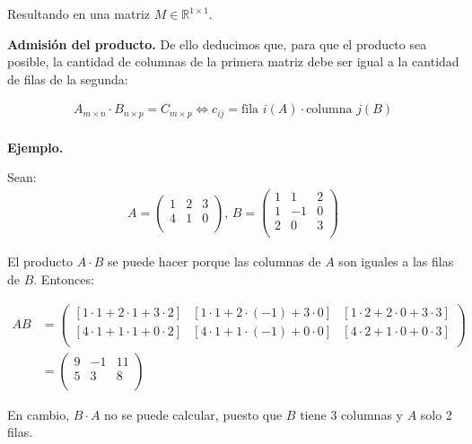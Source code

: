 \documentclass[12pt]{article}
\begin{document}
Resultando en una matriz \(M \in \mathbb{R}^{1 \times 1}\).

\textbf{Admisión del producto.}
De ello deducimos que,
para que el producto sea posible,
la cantidad de columnas de la primera matriz debe ser igual a la cantidad
de filas de la segunda:

\begin{align*}
  A_{m \times n} \cdot B_{n \times p} = C_{m \times p} \iff c_{ij} = \text{fila }i(A) \cdot \text{columna }j(B) \\
\end{align*}

\textbf{Ejemplo.}

Sean:
\begin{align*}
  A = \begin{pmatrix}
        1 & 2 & 3 \\
        4 & 1 & 0 \\
      \end{pmatrix}
  \text{, }
  B = \begin{pmatrix}
        1 & 1  & 2 \\
        1 & -1 & 0 \\
        2 & 0  & 3 \\
      \end{pmatrix}
\end{align*}

El producto \(A \cdot B\) se puede hacer porque las columnas de \(A\) son
iguales a las filas de \(B\). Entonces:

\begin{align*}
  AB & = \begin{pmatrix}
         [1 \cdot 1 + 2 \cdot 1 + 3 \cdot 2] & [1 \cdot 1 + 2 \cdot (-1) + 3 \cdot 0] & [1 \cdot 2 + 2 \cdot 0 + 3 \cdot 3] \\
         [4 \cdot 1 + 1 \cdot 1 + 0 \cdot 2] & [4 \cdot 1 + 1 \cdot (-1) + 0 \cdot 0] & [4 \cdot 2 + 1 \cdot 0 + 0 \cdot 3] \\
       \end{pmatrix}\\
  & =
  \begin{pmatrix}
    9 & -1 & 11 \\
    5 & 3  & 8  \\
  \end{pmatrix}
\end{align*}

En cambio, \(B \cdot A\) no se puede calcular, 
puesto que \(B\) tiene 3 columnas y \(A\) solo 2 filas.
\end{document}
